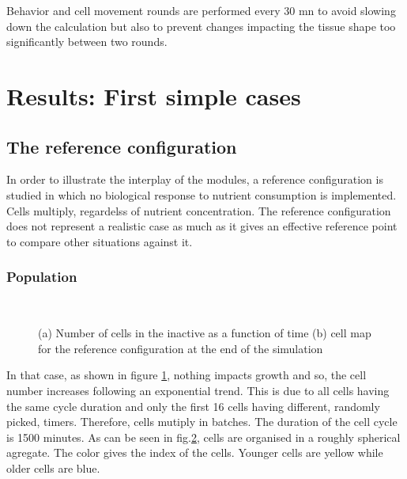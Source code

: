 \documentclass[11pt,a4paper]{article}
\begin{document}
Behavior and cell movement rounds are performed every 30 mn to avoid slowing down the calculation but also to prevent changes impacting the tissue shape too significantly between two rounds.

\section{Results: First simple cases}
\subsection{The reference configuration}
In order to illustrate the interplay of the modules, a reference configuration is studied in which no biological response to nutrient consumption is implemented. Cells multiply, regardelss of nutrient concentration. The reference configuration does not represent a realistic case as much as it gives an effective reference point to compare other situations against it.\\

\subsubsection{Population}
\begin{figure}[ht!]
\begin{subfigure}{0.5\textwidth}
	\centering
	
	\caption{ \label{ref_numbers}}
\end{subfigure}
~~
\begin{subfigure}{0.5\textwidth}
	\centering
	
	\caption{\label{ref_Grid}}
\end{subfigure}
\caption{(a) Number of cells in the inactive as a function of time (b) cell map for the reference configuration at the end of the simulation \label{ref_population}}
\end{figure}

In that case, as shown in figure \ref{ref_numbers}, nothing impacts growth and so, the cell number increases following an exponential trend. This is due to all cells having the same cycle duration and only the first 16 cells having different, randomly picked, timers. Therefore, cells mutiply in batches. The duration of the cell cycle is 1500 minutes. As can be seen in fig.\ref{ref_Grid}, cells are organised in a roughly spherical agregate. The color gives the index of the cells. Younger cells are yellow while older cells are blue. \\ 
\end{document}
